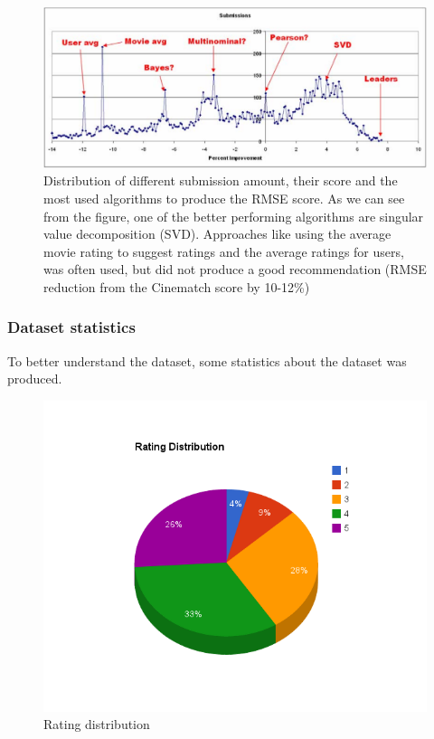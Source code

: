 \begin{figure}[H]
\includegraphics[width=5in]{image/sub-distr-nf.png}
\centering
\caption{Distribution of different submission amount, their score and the most used algorithms to produce the RMSE score. As we can see from the figure, one of the better performing algorithms are singular value decomposition (SVD). Approaches like using the average movie rating to suggest ratings and the average ratings for users, was often used, but did not produce a good recommendation (RMSE reduction from the Cinematch score by 10-12\%)}
\label{figure:sub-distr-nf}
\end{figure}

\subsubsection{Dataset statistics}

To better understand the dataset, some statistics about the dataset was produced.

\begin{figure}[H]
\includegraphics[width=5in]{image/ratingdistr.png}
\centering
\caption{Rating distribution}
\label{figure:ratingdistr}
\end{figure}


